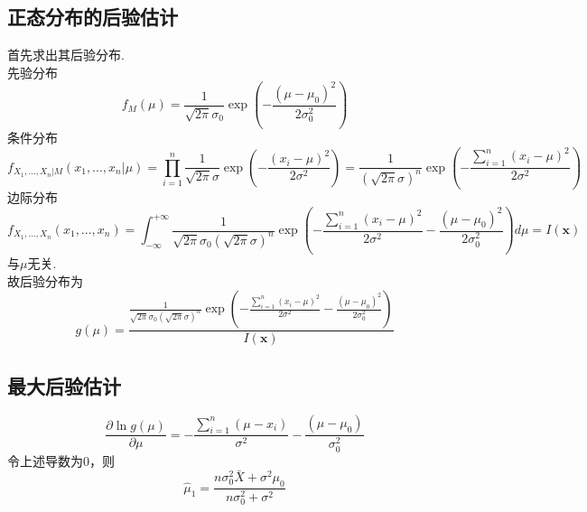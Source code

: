 \documentclass{article}
\begin{document}
\begin{CJK}{UTF8}{gbsn}
\section{正态分布的后验估计}
首先求出其后验分布.\\
先验分布
$$ f_{M}(\mu)=\frac{1}{\sqrt{2\pi}\sigma_{0}}\exp(-\frac{(\mu-\mu_{0})^{2}}{2\sigma_{0}^{2}})$$
条件分布
$$ f_{X_{1},...,X_{n}|M}(x_{1},...,x_{n}|\mu)=\prod\limits_{i=1}^{n}\frac{1}{\sqrt{2\pi}\sigma}\exp(-\frac{(x_{i}-\mu)^{2}}{2\sigma^{2}})=\frac{1}{(\sqrt{2\pi}\sigma)^{n}}\exp(-\frac{\sum\limits_{i=1}^{n}(x_{i}-\mu)^{2}}{2\sigma^{2}})$$
边际分布
$$ f_{X_{1},...,X_{n}}(x_{1},...,x_{n})=\int_{-\infty}^{+\infty}\frac{1}{\sqrt{2\pi}\sigma_{0}(\sqrt{2\pi}\sigma)^{n}}\exp(-\frac{\sum\limits_{i=1}^{n}(x_{i}-\mu)^{2}}{2\sigma^{2}}-\frac{(\mu-\mu_{0})^{2}}{2\sigma_{0}^{2}})d\mu=I(\mathbf{x})$$
与$\mu$无关.\\
故后验分布为
$$ g(\mu)=\frac{\frac{1}{\sqrt{2\pi}\sigma_{0}(\sqrt{2\pi}\sigma)^{n}}\exp(-\frac{\sum\limits_{i=1}^{n}(x_{i}-\mu)^{2}}{2\sigma^{2}}-\frac{(\mu-\mu_{0})^{2}}{2\sigma_{0}^{2}})}{I(\mathbf{x})}$$
\subsection{最大后验估计}
$$ \frac{\partial\ln g(\mu)}{\partial\mu}=-\frac{\sum\limits_{i=1}^{n}(\mu-x_{i})}{\sigma^{2}}-\frac{(\mu-\mu_{0})}{\sigma_{0}^{2}}$$
令上述导数为0，则
$$ \hat{\mu}_{1}=\frac{n\sigma_{0}^{2}\bar{X}+\sigma^{2}\mu_{0}}{n\sigma_{0}^{2}+\sigma^{2}}$$

\end{CJK}
\end{document}
